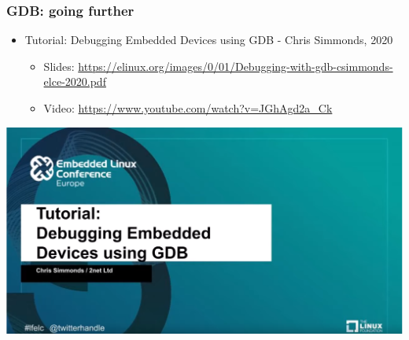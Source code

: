 \begin{frame}
  \frametitle{GDB: going further}
  \begin{itemize}
    \item Tutorial: Debugging Embedded Devices using GDB - Chris Simmonds, 2020
    \begin{itemize}
      \item Slides: \url{https://elinux.org/images/0/01/Debugging-with-gdb-csimmonds-elce-2020.pdf}
      \item Video: \url{https://www.youtube.com/watch?v=JGhAgd2a_Ck}
    \end{itemize}
  \end{itemize}
  \begin{center}
    \includegraphics[height=0.6\textheight]{slides/debugging-application-debugging/gdb_tuto_elce_2020.png}
  \end{center}
\end{frame}

